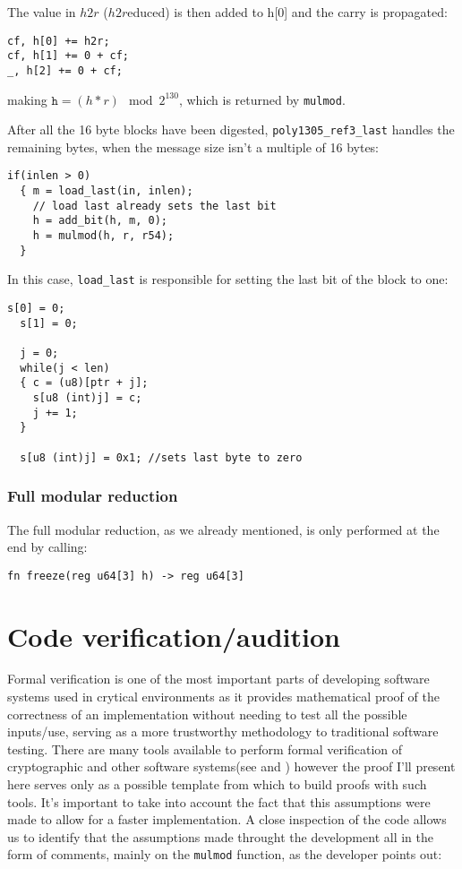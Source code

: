 \documentclass{article}
\begin{document}
The value in $h2r$ ($h2r$educed) is then added to h[0] and the carry is propagated:

\begin{Verbatim}[fontsize=\footnotesize]
cf, h[0] += h2r;
cf, h[1] += 0 + cf;
_, h[2] += 0 + cf;
\end{Verbatim}

making $\texttt{h} = (h*r)\mod{2^{130}}$, which is returned by \texttt{mulmod}.

After all the 16 byte blocks have been digested, \texttt{poly1305\_ref3\_last} handles the remaining bytes, when the message size isn't a multiple of 16 bytes:
\begin{Verbatim}[fontsize=\footnotesize]
if(inlen > 0)
  { m = load_last(in, inlen);
    // load last already sets the last bit
    h = add_bit(h, m, 0);
    h = mulmod(h, r, r54);
  }
\end{Verbatim}
In this case, \texttt{load\_last} is responsible for setting the last bit of the block to one:
\begin{Verbatim}[fontsize=\footnotesize]
  s[0] = 0;
  s[1] = 0;

  j = 0;
  while(j < len)
  { c = (u8)[ptr + j];
    s[u8 (int)j] = c;
    j += 1;
  }

  s[u8 (int)j] = 0x1; //sets last byte to zero
\end{Verbatim}

\subsubsection{Full modular reduction}
The full modular reduction, as we already mentioned, is only performed at the end by calling:
\begin{Verbatim}[fontsize=\footnotesize]
fn freeze(reg u64[3] h) -> reg u64[3]
\end{Verbatim}


\section{Code verification/audition}
Formal verification is one of the most important parts of developing software systems used in crytical environments as it provides mathematical proof of the
correctness of an implementation without needing to test all the possible inputs/use, serving as a more trustworthy methodology to traditional software 
testing. There are many tools available to perform formal verification of cryptographic and other software systems(see \cite{coq_proof} and \cite{easycrypt}) 
however the proof I'll present here serves only as a possible template from which to build proofs with such tools.
It's important to take into account the fact that this assumptions were made to allow for a faster implementation.
A close inspection of the code allows us to identify that the assumptions made throught the development all in the form of comments, mainly on the
\texttt{mulmod} function, as the developer points out:
\end{document}
